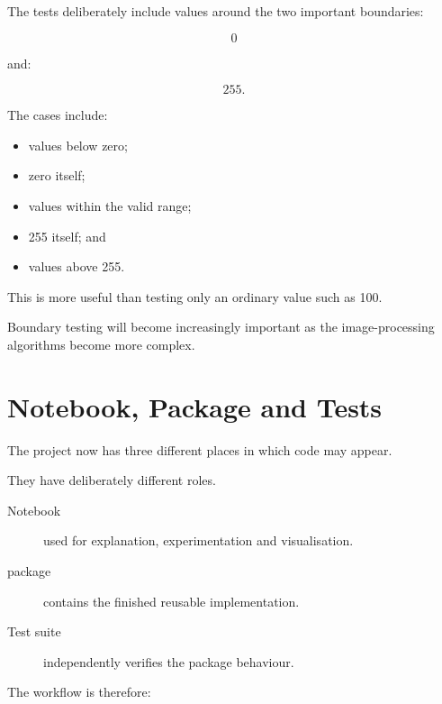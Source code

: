 The tests deliberately include values around the two important
boundaries:

\begin{equation}
0
\end{equation}

and:

\begin{equation}
255.
\end{equation}

The cases include:

\begin{itemize}
    \item values below zero;
    \item zero itself;
    \item values within the valid range;
    \item 255 itself; and
    \item values above 255.
\end{itemize}

This is more useful than testing only an ordinary value such as 100.

Boundary testing will become increasingly important as the
image-processing algorithms become more complex.


\section{Notebook, Package and Tests}
\label{sec:notebook-package-tests}

The project now has three different places in which code may appear.

They have deliberately different roles.

\begin{description}

    \item[Notebook]
    used for explanation, experimentation and visualisation.

    \item[\pyimage{} package]
    contains the finished reusable implementation.

    \item[Test suite]
    independently verifies the package behaviour.

\end{description}

The workflow is therefore:

